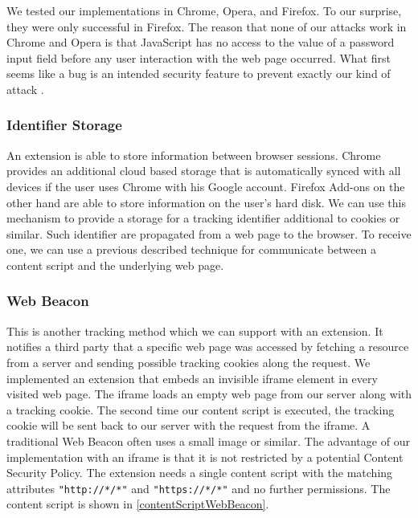 			We tested our implementations in Chrome, Opera, and Firefox. To our surprise, they were only successful in Firefox. The reason that none of our attacks work in Chrome and Opera is that JavaScript has no access to the value of a password input field before any user interaction with the web page occurred. What first seems like a bug is an intended security feature to prevent exactly our kind of attack \cite{chromiumBlogPasswordInput}.
		
		\subsubsection{Identifier Storage} 
			
			An extension is able to store information between browser sessions. Chrome provides an additional cloud based storage that is automatically synced with all devices if the user uses Chrome with his Google account. Firefox Add-ons on the other hand are able to store information on the user's hard disk. We can use this mechanism to provide a storage for a tracking identifier additional to cookies or similar. Such identifier are propagated from a web page to the browser. To receive one, we can use a previous described technique for communicate between a content script and the underlying web page. \\ %
		
		\subsubsection{Web Beacon}
		
			This is another tracking method which we can support with an extension. It notifies a third party that a specific web page was accessed by fetching a resource from a server and sending possible tracking cookies along the request. We implemented an extension that embeds an invisible iframe element in every visited web page. The iframe loads an empty web page from our server along with a tracking cookie. The second time our content script is executed, the tracking cookie will be sent back to our server with the request from the iframe. A traditional Web Beacon often uses a small image or similar. The advantage of our implementation with an iframe is that it is not restricted by a potential Content Security Policy. The extension needs a single content script with the matching attributes \texttt{"http://*/*"} and \texttt{"https://*/*"} and no further permissions. The content script is shown in \autoref{contentScriptWebBeacon}.
			

